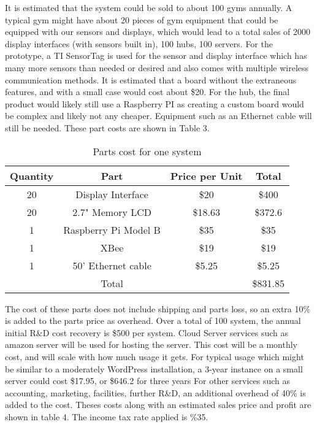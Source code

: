 \documentclass[PPFS.tex]{template/subfiles}
\begin{document}
        It is estimated that the system could be sold to about 100 gyms annually. A typical gym might have about 20 pieces of gym equipment that could be equipped with our sensors and displays, which would lead to a total sales of 2000 display interfaces (with sensors built in), 100 hubs, 100 servers. 
        For the prototype, a TI SensorTag is used for the sensor and display interface which has many more sensors than needed or desired and also comes with multiple wireless communication methods. It is estimated that a board without the extraneous features, and with a small case would cost about \$20.
        For the hub, the final product would likely still use a Raspberry PI as creating a custom board would be complex and likely not any cheaper. Equipment such as an Ethernet cable will still be needed.
        These part costs are shown in Table 3.
        
        \begin{table}[h!]
        	\begin{center}
        		\caption{Parts cost for one system}
        		\begin{tabular}{|c|c|c|c|}
        			\hline
        			Quantity & Part & Price per Unit & Total\\
        			\hline
        			20 & Display Interface & \$20 & \$400\\
        			\hline
        			20 & 2.7" Memory LCD & \$18.63 \cite{mouserMemoryLCD} & \$372.6\\
        			\hline
        			1 & Raspberry Pi Model B & \$35 \cite{alliedRaspberryPi} & \$35\\
        			\hline
        			1 & XBee & \$19 \cite{mouserXBEE} & \$19\\
        			\hline
        			1 & 50' Ethernet cable & \$5.25 \cite{amazonEthernetCable} & \$5.25\\
        			\hline
        			&Total&& \$831.85\\
        			\hline
        		\end{tabular}
        	\end{center}
        \end{table}
        
        The cost of these parts does not include shipping and parts loss, so an extra 10\% is added to the parts price as overhead. 
        Over a total of 100 system, the annual initial R\&D cost recovery is \$500 per system.
        Cloud Server services such as amazon server will be used for hosting the server. This cost will be a monthly cost, and will scale with how much usage it gets. For typical usage which might be similar to a moderately WordPress installation, a 3-year instance on a small server could cost \$17.95, or \$646.2 for three years \cite{wordPressEstimate}
        For other services such as accounting, marketing, facilities, further R\&D, an additional overhead of 40\% is added to the cost.
        Theses costs along with an estimated sales price and profit are shown in table 4. The income tax rate applied is \%35.
        
\end{document}
